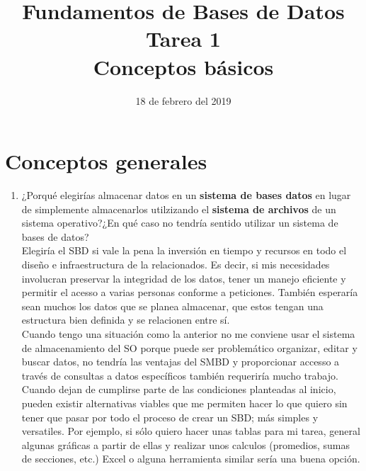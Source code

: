 \documentclass[10pt]{article}
\begin{document}
    \title{Fundamentos de Bases de Datos \\
        Tarea 1 \\
        Conceptos básicos} 
    \author{}
    \date{18 de febrero del 2019}
    \maketitle
    
    \section{Conceptos generales}\vspace{0.5cm}

        \begin{enumerate}[label=\alph*.]
    	\item  {¿Porqué elegirías almacenar datos en un \textbf{sistema de bases 
    			datos} en lugar de simplemente almacenarlos utilzizando el 
    		\textbf{sistema de archivos} de un sistema operativo?¿En qué caso no
    		tendría sentido utilizar un sistema de bases de datos?
    	}\\
    	{
    	   Elegiría el SBD si vale la pena la inversión en tiempo y     recursos en todo el diseño e infraestructura de la relacionados. Es decir, si mis 
    		necesidades involucran preservar la integridad de los datos, tener un manejo
    		eficiente y permitir el acesso a varias personas conforme a peticiones.
    		También esperaría sean muchos los datos que se planea almacenar, que 
    		estos tengan una estructura bien definida y se relacionen entre sí.\\
    		Cuando tengo una situación como la anterior no me conviene usar el sistema
    		de almacenamiento del SO porque puede ser problemático organizar, editar
    		y buscar datos, no tendría las ventajas del SMBD y proporcionar accesso a
    		través de consultas a datos específicos también requeriría mucho trabajo.\\
    		Cuando dejan de cumplirse parte de las condiciones planteadas al inicio, pueden
    		existir alternativas viables que me permiten hacer lo que quiero sin tener que 
    		pasar por todo el proceso de crear un SBD; más simples y versatiles.
    		Por ejemplo, si sólo quiero hacer unas tablas para mi tarea, general algunas
    		gráficas a partir de ellas y realizar unos calculos (promedios, sumas de
    		secciones, etc.) Excel o alguna herramienta similar sería una buena opción.
    	}\\
    

\end{enumerate}
\end{document}
